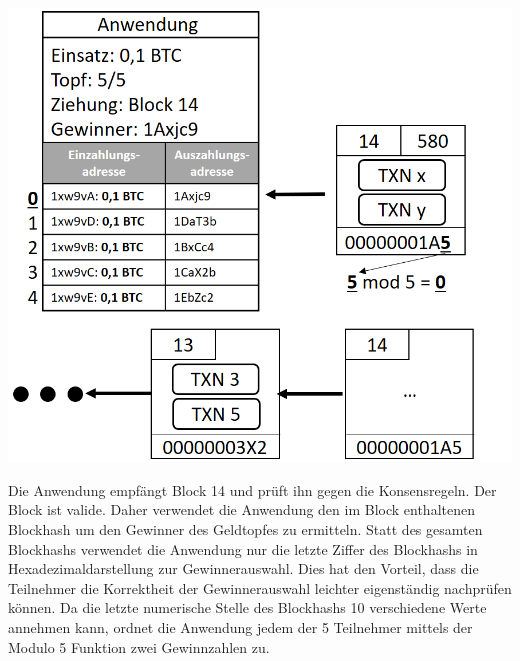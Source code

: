 \vspace{1cm}
\begin{minipage}{0.55\textwidth}
\includegraphics[width=\textwidth]{Figures/konzept_btc/konzept10}
\centering
\decoRule
{}
\label{fig:konzept10}
\end{minipage}
\begin{minipage}{0.45\textwidth}
Die Anwendung empfängt Block 14 und prüft ihn gegen die Konsensregeln. Der Block ist valide. Daher verwendet die Anwendung den im Block enthaltenen Blockhash um den Gewinner des Geldtopfes zu ermitteln. Statt des gesamten Blockhashs verwendet die Anwendung nur die letzte Ziffer des Blockhashs in Hexadezimaldarstellung zur Gewinnerauswahl. Dies hat den Vorteil, dass die Teilnehmer die Korrektheit der Gewinnerauswahl leichter eigenständig nachprüfen können.
Da die letzte numerische Stelle des Blockhashs 10 verschiedene Werte annehmen kann, ordnet die Anwendung jedem der 5 Teilnehmer mittels der Modulo 5 Funktion zwei Gewinnzahlen zu.
\end{minipage}


